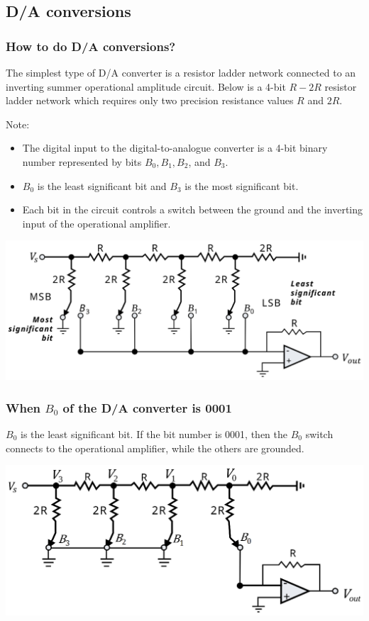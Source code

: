 \documentclass[11pt]{article}
\begin{document}
 \newpage
\subsection{D/A conversions}
\label{sec:org81f2653}

\subsubsection{How to do D/A conversions?}
\label{sec:org14713b7}
The simplest type of D/A converter is a resistor ladder network connected to an inverting summer operational amplitude circuit. Below is a 4-bit \(R-2R\) resistor ladder network which requires only two precision resistance values \(R\) and \(2R\).

Note:
\begin{itemize}
\item The digital input to the digital-to-analogue converter is a 4-bit binary number represented by bits \(B_0, B_1, B_2\), and \(B_3\).
\item \(B_0\) is the least significant bit and \(B_3\) is the most significant bit.
\item Each bit in the circuit controls a switch between the ground and the inverting input of the operational amplifier.
\end{itemize}

\begin{center}
\includegraphics[width=.9\linewidth]{./images/d-a-converter-circuit-diagram.png}
\end{center}

 \newpage
\subsubsection{When \(B_0\) of the D/A converter is 0001}
\label{sec:org6e92fef}
\(B_0\) is the least significant bit. If the bit number is 0001, then the \(B_0\) switch connects to the operational amplifier, while the others are grounded.

\begin{center}
\includegraphics[width=.9\linewidth]{./images/d-a-converter-bit-0001-circuit.png}
\end{center}
\end{document}
